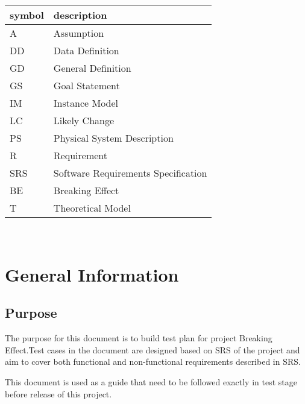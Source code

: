 \documentclass[12pt, titlepage]{article}
\begin{document}
	\renewcommand{\arraystretch}{1.2}
	\begin{tabular}{l l} 
		\toprule		
		\textbf{symbol} & \textbf{description}\\
		\midrule 
		A & Assumption\\
		DD & Data Definition\\
		GD & General Definition\\
		GS & Goal Statement\\
		IM & Instance Model\\
		LC & Likely Change\\
		PS & Physical System Description\\
		R & Requirement\\
		SRS & Software Requirements Specification\\
		BE & Breaking Effect\\
		T & Theoretical Model\\
		\bottomrule
	\end{tabular}\\
	
	
\newpage

\tableofcontents

\listoftables

\listoffigures


\newpage


\section{General Information}

\subsection{Purpose}

The purpose for this document is to build test plan for project Breaking
Effect.Test cases in the document are designed based on SRS of the project and
aim to cover both functional and non-functional requirements described in SRS.\\

This document is used as a guide that need to be followed exactly in test stage before release of this project. \\
\end{document}
